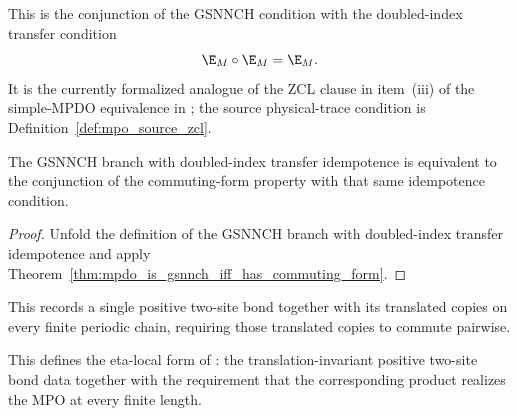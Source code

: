 \begin{definition}
    \label{def:mpdo_is_gsnnch_zcl}
    \leanok
    This is the conjunction of the GSNNCH condition with the doubled-index
    transfer condition
    \[
        \E_M\circ\E_M=\E_M.
    \]
    It is the currently formalized analogue of the ZCL clause in item~(iii) of
    the simple-MPDO equivalence in \cite{Cirac2016MPDO_arXiv}; the
    source physical-trace condition is Definition~\ref{def:mpo_source_zcl}.
\end{definition}

\begin{theorem}
    \label{thm:mpdo_is_gsnnch_zcl_iff_has_commuting_form_and_is_zcl}
    \leanok
    The GSNNCH branch with doubled-index transfer idempotence is equivalent to
    the conjunction of the commuting-form property with that same idempotence
    condition.
\end{theorem}

\begin{proof}\leanok
    Unfold the definition of the GSNNCH branch with doubled-index transfer
    idempotence and apply
    Theorem~\ref{thm:mpdo_is_gsnnch_iff_has_commuting_form}.
\end{proof}

\begin{definition}
    \label{def:mpdo_translation_invariant_bond_data}
    \leanok
    This records a single positive two-site bond together with its translated
    copies on every finite periodic chain, requiring those translated copies to
    commute pairwise.
\end{definition}

\begin{definition}
    \label{def:mpdo_eta_local_structure_data}
    \leanok
    This defines the eta-local form of \cite[Appendix~C.2]{Cirac2016MPDO_arXiv}: the
    translation-invariant positive two-site bond data together with the
    requirement that the corresponding product realizes the MPO at every finite
    length.
\end{definition}

